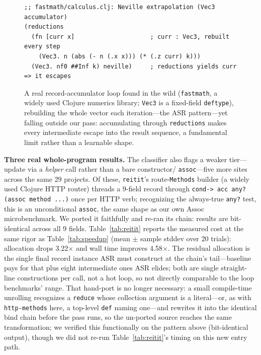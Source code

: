 \documentclass[sigplan,screen,review,anonymous]{acmart}
\begin{document}
\begin{figure}
\begin{lstlisting}
;; fastmath/calculus.clj: Neville extrapolation (Vec3 accumulator)
(reductions
  (fn [curr x]                     ; curr : Vec3, rebuilt every step
    (Vec3. n (abs (- n (.x x))) (* (.z curr) k)))
  (Vec3. nf0 ##Inf k) neville)     ; reductions yields curr => it escapes
\end{lstlisting}
\caption{A real record-accumulator loop found in the wild (\texttt{fastmath}, a
widely used Clojure numerics library; \texttt{Vec3} is a fixed-field
\texttt{deftype}), rebuilding the whole vector each iteration---the ASR
pattern---yet falling outside our pass: accumulating through
\texttt{reductions} makes every intermediate escape into the result
sequence, a fundamental limit rather than a learnable shape.}
\label{fig:wild}
\end{figure}

\textbf{Three real whole-program results.} The classifier also flags a weaker
tier---update via a \emph{helper} call rather than a bare constructor/
\texttt{assoc}---five more sites across the same 29 projects. Of these,
\texttt{reitit}'s route-\texttt{Methods} builder (a widely used Clojure HTTP
router) threads a 9-field record through \texttt{cond-> acc any? (assoc
method ...)} once per HTTP verb; recognizing the always-true \texttt{any?}
test, this is an unconditional \texttt{assoc}, the same shape as our own
Assoc microbenchmark. We ported it faithfully and re-ran its chain: results
are bit-identical across all 9 fields. Table~\ref{tab:reitit} reports the
measured cost at the same rigor as Table~\ref{tab:speedup} (mean $\pm$ sample
stddev over 20 trials): allocation drops 3.22$\times$ and wall time improves
4.58$\times$. The residual allocation is the single final record instance
ASR must construct at the chain's tail---baseline pays for that plus
eight intermediate ones ASR elides; both are single straight-line
constructions per call, not a hot loop, so not directly comparable
to the loop benchmarks' range. That hand-port is no longer necessary: a
small compile-time unrolling recognizes a \texttt{reduce} whose collection
argument is a literal---or, as with \texttt{http-methods} here, a top-level
\texttt{def} naming one---and rewrites it into the identical bind chain
before the pass runs, so the un-ported source reaches the same
transformation; we verified this functionally on the pattern
above (bit-identical output), though we did not re-run
Table~\ref{tab:reitit}'s timing on this new entry path.
\end{document}
